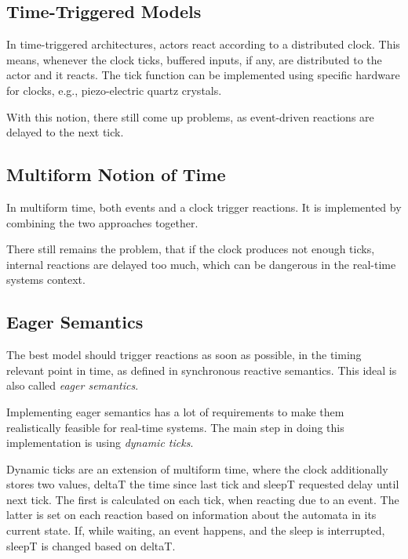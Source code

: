 \subsection{Time-Triggered Models}
In time-triggered architectures, actors react according to a distributed clock.
This means, whenever the clock ticks, buffered inputs, if any, are distributed to the actor and it reacts.
The tick function can be implemented using specific hardware for clocks, e.g., piezo-electric quartz crystals.

With this notion, there still come up problems, as event-driven reactions are delayed to the next tick.

\subsection{Multiform Notion of Time}
In multiform time, both events and a clock trigger reactions.
It is implemented by combining the two approaches together.

There still remains the problem, that if the clock produces not enough ticks, internal reactions are delayed too much, which can be dangerous in the real-time systems context.

\subsection{Eager Semantics}
The best model should trigger reactions as soon as possible, in the timing relevant point in time, as defined in synchronous reactive semantics.
This ideal is also called \emph{eager semantics}.

Implementing eager semantics has a lot of requirements to make them realistically feasible for real-time systems.
The main step in doing this implementation is using \emph{dynamic ticks}.

Dynamic ticks are an extension of multiform time, where the clock additionally stores two values, \textsf{deltaT} the time since last tick and \textsf{sleepT} requested delay until next tick.
The first is calculated on each tick, when reacting due to an event.
The latter is set on each reaction based on information about the automata in its current state.
If, while waiting, an event happens, and the sleep is interrupted, \textsf{sleepT} is changed based on \textsf{deltaT}.
